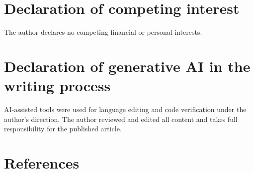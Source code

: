 \documentclass[12pt]{article}
\begin{document}
\section*{Declaration of competing interest}
The author declares no competing financial or personal interests.

\section*{Declaration of generative AI in the writing process}
AI-assisted tools were used for language editing and code verification under the author's direction. The author reviewed and edited all content and takes full responsibility for the published article.

\section*{References}
\end{document}
